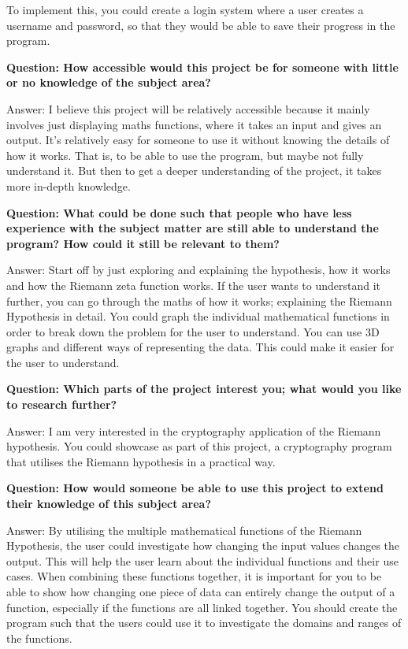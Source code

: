 \documentclass[12pt]{article}
\begin{document}
To implement this, you could create a login system where a user creates a username and password, so that they would be able to save their progress in the program.

\textbf{Question: How accessible would this project be for someone with little or no knowledge of the subject area?}

Answer: I believe this project will be relatively accessible because it mainly involves just displaying maths functions, where it takes an input and gives an output. It's relatively easy for someone to use it without knowing the details of how it works. That is, to be able to use the program, but maybe not fully understand it. But then to get a deeper understanding of the project, it takes more in-depth knowledge.

\textbf{Question: What could be done such that people who have less experience with the subject matter are still able to understand the program? How could it still be relevant to them?}

Answer: Start off by just exploring and explaining the hypothesis, how it works and how the Riemann zeta function works. If the user wants to understand it further, you can go through the maths of how it works; explaining the Riemann Hypothesis in detail. You could graph the individual mathematical functions in order to break down the problem for the user to understand.  You can use 3D graphs and different ways of representing the data. This could make it easier for the user to understand.

\textbf{Question: Which parts of the project interest you; what would you like to research further?}

Answer: I am very interested in the cryptography application of the Riemann hypothesis. You could showcase as part of this project, a cryptography program that utilises the Riemann hypothesis in a practical way.

\textbf{Question: How would someone be able to use this project to extend their knowledge of this subject area?}

Answer: By utilising the multiple mathematical functions of the Riemann Hypothesis, the user could investigate how changing the input values changes the output. This will help the user learn about the individual functions and their use cases. When combining these functions together, it is important for you to be able to show how changing one piece of data can entirely change the output of a function, especially if the functions are all linked together. You should create the program such that the users could use it to investigate the domains and ranges of the functions.
\end{document}

